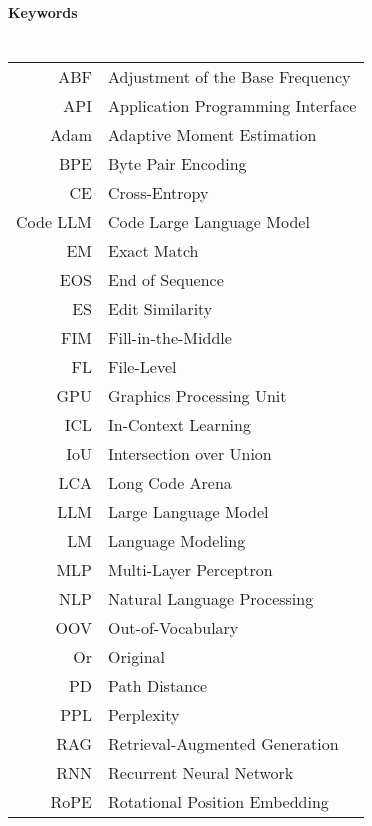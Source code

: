 \documentclass[english,bachelor,unicode,oneside]{ctufit-thesis}
\begin{document}
\begin{abstractpage}
\begin{abstract}%
\thectufitabstract
\end{abstract}

\vskip 0.5cm

{\noindent\color{heading}\bfseries Keywords\hspace{1em}}{\thectufitkeywords}
\end{abstractpage}
\cleardoublepage

\printczechabstractpage

\tableofcontents
\listoffigures %
\begingroup
\let\clearpage\relax
\listoftables %
\endgroup

\chapter{\thectufitabbreviationlabel}

\begin{tabular}{rl}
  ABF & Adjustment of the Base Frequency\\
  API & Application Programming Interface\\
  Adam & Adaptive Moment Estimation\\
  BPE & Byte Pair Encoding\\
  CE & Cross-Entropy\\
  Code LLM & Code Large Language Model\\
  EM & Exact Match\\
  EOS & End of Sequence\\
  ES & Edit Similarity\\
  FIM & Fill-in-the-Middle\\
  FL & File-Level\\
  GPU & Graphics Processing Unit\\
  ICL & In-Context Learning\\
  IoU & Intersection over Union\\
  LCA & Long Code Arena\\
  LLM & Large Language Model\\
  LM & Language Modeling\\
  MLP & Multi-Layer Perceptron\\
  NLP & Natural Language Processing\\
  OOV & Out-of-Vocabulary\\
  Or & Original\\
  PD & Path Distance\\
  PPL & Perplexity\\
  RAG & Retrieval-Augmented Generation\\
  RNN & Recurrent Neural Network\\
  RoPE & Rotational Position Embedding\\
\end{tabular}
\end{document}
